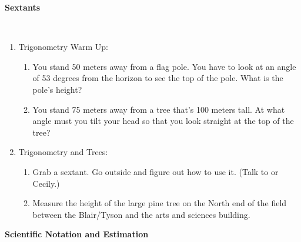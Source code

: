 \documentclass[12pt]{article}
\begin{document}
\newpage

\begin{center}
  {\bf Sextants }\\
\end{center}

\hspace{2mm}\\

\begin{enumerate}

\item Trigonometry Warm Up:
\begin{enumerate}
\setlength{\itemsep}{0mm}
  \item You stand 50 meters away from a flag pole.  You have to look
  at an angle of 53 degrees from the horizon to see the top of the
  pole.  What is the pole's height? 

  \item You stand 75 meters away from a tree that's 100 meters tall.
  At what angle must you tilt your head so that you look straight at
  the top of the tree? 

\end{enumerate} 

\item Trigonometry and Trees:

\begin{enumerate}
\setlength{\itemsep}{0mm}
  \item Grab a sextant.  Go outside and figure out how to use it.
  (Talk to or Cecily.) 

  \item Measure the height of the large pine tree on the North end of
  the field between the Blair/Tyson and the arts and sciences
  building.  
\end{enumerate}

\end{enumerate}

\newpage

{\bf Scientific Notation and Estimation}\\
\end{document}
